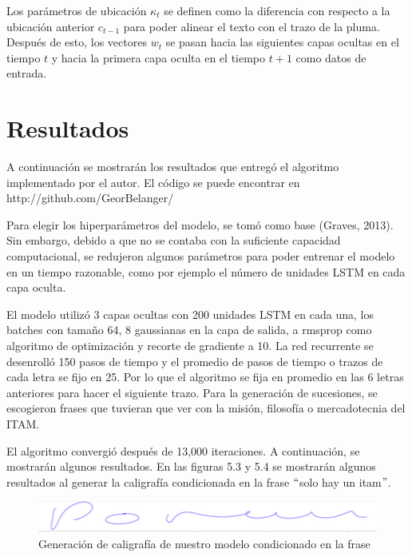 Los parámetros de ubicación $\kappa_t$ se definen como la diferencia con respecto a la ubicación anterior $c_{t-1}$ para poder alinear el texto con el trazo de la pluma. Después de esto, los vectores $w_t$ se pasan hacia las siguientes capas ocultas en el tiempo $t$ y hacia la primera capa oculta en el tiempo $t+1$ como datos de entrada.


\section{Resultados}

A continuación se mostrarán los resultados que entregó el algoritmo implementado por el autor. El código se puede encontrar en http://github.com/GeorBelanger/

\vspace{1em}

Para elegir los hiperparámetros del modelo, se tomó como base (Graves, 2013). Sin embargo, debido a que no se contaba con la suficiente capacidad computacional, se redujeron algunos parámetros para poder entrenar el modelo en un tiempo razonable, como por ejemplo el número de unidades LSTM en cada capa oculta.

\vspace{1em}

El modelo utilizó 3 capas ocultas con 200 unidades LSTM en cada una, los batches con tamaño 64, 8 gaussianas en la capa de salida, a rmsprop como algoritmo de optimización y recorte de gradiente a 10. La red recurrente se desenrolló 150 pasos de tiempo y el promedio de pasos de tiempo o trazos de cada letra se fijo en 25. Por lo que el algoritmo se fija en promedio en las 6 letras anteriores para hacer el siguiente trazo. Para la generación de sucesiones, se escogieron frases que tuvieran que ver con la misión, filosofía o mercadotecnia del ITAM.

\vspace{1em}

 El algoritmo convergió después de 13,000 iteraciones. A continuación, se mostrarán algunos resultados. En las figuras 5.3 y 5.4 se mostrarán algunos resultados al generar la caligrafía condicionada en la frase $``$solo hay un itam$"$.
 
\begin{figure}[h]
\begin{center}
\includegraphics{./imag/porunmexico4700.png}
\end{center}
\caption{Generación de caligrafía de nuestro modelo condicionado en la frase}
\end{figure}

